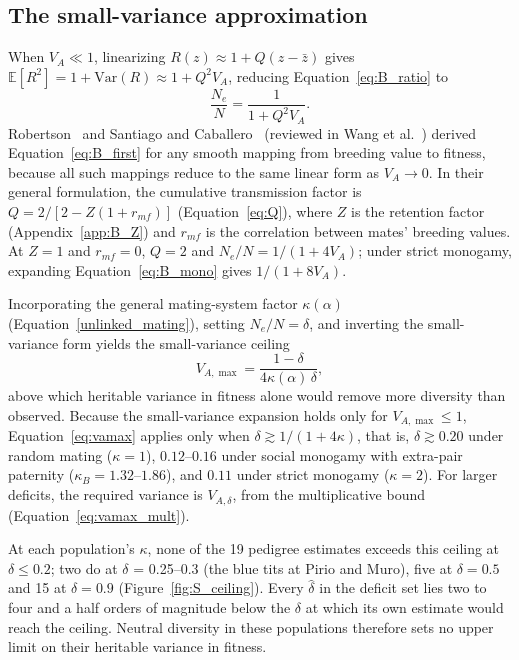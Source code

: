 \documentclass{article}
\begin{document}
\subsection{The small-variance approximation}\label{app:B_first}
When $V_A \ll 1$, linearizing $R(z) \approx 1 + Q(z - \bar{z})$ gives $\mathbb{E}[R^2] = 1 + \mathrm{Var}(R) \approx 1 + Q^2V_A$, reducing Equation~\eqref{eq:B_ratio} to
\begin{equation}
    \frac{N_e}{N} = \frac{1}{1 + Q^2V_A}. \label{eq:B_first}
\end{equation}
Robertson~\cite{robertson1961} and Santiago and Caballero~\cite{santiago1995} (reviewed in Wang et al.~\cite{wang2016}) derived Equation~\eqref{eq:B_first} for any smooth mapping from breeding value to fitness, because all such mappings reduce to the same linear form as $V_A \to 0$. In their general formulation, the cumulative transmission factor is $Q = 2/[2 - Z(1 + r_{mf})]$ (Equation~\eqref{eq:Q}), where $Z$ is the retention factor (Appendix~\ref{app:B_Z}) and $r_{mf}$ is the correlation between mates' breeding values. At $Z = 1$ and $r_{mf} = 0$, $Q = 2$ and $N_e/N = 1/(1 + 4V_A)$; under strict monogamy, expanding Equation~\eqref{eq:B_mono} gives $1/(1 + 8V_A)$.

Incorporating the general mating-system factor $\kappa(\alpha)$ (Equation~\eqref{unlinked_mating}), setting $N_e/N = \delta$, and inverting the small-variance form yields the small-variance ceiling
\begin{equation}
    V_{A,\max} = \frac{1 - \delta}{4\kappa(\alpha)\,\delta}, \label{eq:vamax}
\end{equation}
above which heritable variance in fitness alone would remove more diversity than observed. Because the small-variance expansion holds only for $V_{A,\max} \le 1$, Equation~\eqref{eq:vamax} applies only when $\delta \gtrsim 1/(1 + 4\kappa)$, that is, $\delta \gtrsim 0.20$ under random mating ($\kappa = 1$), $0.12$--$0.16$ under social monogamy with extra-pair paternity ($\kappa_B = 1.32$--$1.86$), and $0.11$ under strict monogamy ($\kappa = 2$). For larger deficits, the required variance is $V_{A,\delta}$, from the multiplicative bound (Equation~\eqref{eq:vamax_mult}).

At each population's $\kappa$, none of the 19 pedigree estimates exceeds this ceiling at $\delta \le 0.2$; two do at $\delta$ = 0.25--0.3 (the blue tits at Pirio and Muro), five at $\delta = 0.5$ and 15 at $\delta = 0.9$ (Figure~\ref{fig:S_ceiling}). Every $\hat{\delta}$ in the deficit set lies two to four and a half orders of magnitude below the $\delta$ at which its own estimate would reach the ceiling. Neutral diversity in these populations therefore sets no upper limit on their heritable variance in fitness.
\end{document}
